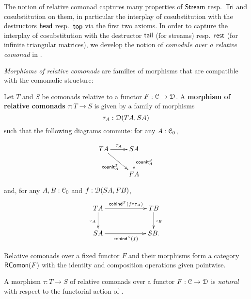 \documentclass[a4paper,USenglish]{lipics}
\newcommand{\fat}[1]{\textbf{#1}}
\begin{document}
The notion of relative comonad captures many properties of $\mathsf{Stream}$ resp.\ $\mathsf{Tri}$ and cosubstitution on them, in particular the interplay
of cosubstitution with the destructors $\mathsf{head}$ resp.\ $\mathsf{top}$ via the first two axioms.
In order to  capture the interplay 
of cosubstitution  with the destructor $\mathsf{tail}$ (for streams) resp.\ $\mathsf{rest}$ (for infinite triangular matrices), we develop the notion of \emph{comodule over a relative comonad}
 in . 




\emph{Morphisms of relative comonads} are families of morphisms that are compatible with the comonadic structure:

\begin{defn}%
\label{def:comonad_morphism}
 Let $T$ and $S$ be comonads relative to a functor $F : {\mathcal{C}} \to \mathcal{D}$. A \fat{morphism of relative comonads} $\tau : T \to S$
  is given by a family of morphisms \[\tau_A : \mathcal{D}(TA,SA)\] such that the following diagrams commute: for any $A : {\mathcal{C}}_0$,
     
\[ \begin{xy}
    \xymatrix {
                       TA \ar[r]^{\tau_A} \ar[rd]_{\counit^T_A}  &   SA \ar[d]^{\counit^S_A}\\
                            &    FA
   }
   \end{xy}
\]

  and, for any $A,B : {\mathcal{C}}_0$ and $f : \mathcal{D}(SA,FB)$,
\[ \begin{xy}
     \xymatrix@C=6em{
                     TA \ar[d]_{\tau_A}   \ar[r]^{\cobind^T(\comp{\tau_A}{f})} & TB \ar[d]^{\tau_B}\\
                     SA \ar[r]_{\cobind^S(f)} & SB .
     }  
   \end{xy}
\]

\end{defn}

Relative comonads over a fixed functor $F$ and their morphisms form a category $\mathsf{RComon}(F)$ with the identity and composition operations given pointwise.

\begin{rem}
A morphism $\tau : T\to S$ of relative comonads over a functor $F:{\mathcal{C}}\to\mathcal{D}$ is  \emph{natural}
with respect to the functorial action of .
\end{rem}
\end{document}
